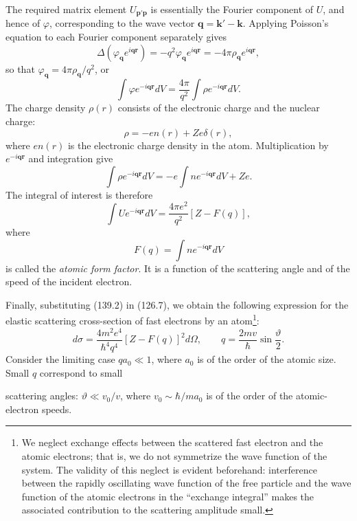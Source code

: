 The required matrix element $U_{\mathbf p'\mathbf p}$ is essentially the
Fourier component of $U$, and hence of $\varphi$, corresponding to the wave
vector $\mathbf q=\mathbf k'-\mathbf k$. Applying Poisson's equation to each
Fourier component separately gives
\[
 \Delta(\varphi_{\mathbf q}e^{i\mathbf{qr}})=-q^2\varphi_{\mathbf q}e^{i\mathbf{qr}}
 =-4\pi\rho_{\mathbf q}e^{i\mathbf{qr}},
\]
so that $\varphi_{\mathbf q}=4\pi\rho_{\mathbf q}/q^2$, or
\begin{equation}
 \int\varphi e^{-i\mathbf{qr}}dV=\frac{4\pi}{q^2}\int\rho e^{-i\mathbf{qr}}dV.
 \tag{139.1}
\end{equation}
The charge density $\rho(r)$ consists of the electronic charge and the nuclear
charge:
\[
 \rho=-en(r)+Ze\delta(r),
\]
where $en(r)$ is the electronic charge density in the atom. Multiplication by
$e^{-i\mathbf{qr}}$ and integration give
\[
 \int\rho e^{-i\mathbf{qr}}dV=-e\int ne^{-i\mathbf{qr}}dV+Ze.
\]
The integral of interest is therefore
\begin{equation}
 \int Ue^{-i\mathbf{qr}}dV=\frac{4\pi e^2}{q^2}[Z-F(q)],
 \tag{139.2}
\end{equation}
where
\begin{equation}
 F(q)=\int ne^{-i\mathbf{qr}}dV
 \tag{139.3}
\end{equation}
is called the \emph{atomic form factor}. It is a function of the scattering
angle and of the speed of the incident electron.

Finally, substituting (139.2) in (126.7), we obtain the following expression
for the elastic scattering cross-section of fast electrons by an
atom\footnote{We neglect exchange effects between the scattered fast electron
and the atomic electrons; that is, we do not symmetrize the wave function of
the system. The validity of this neglect is evident beforehand: interference
between the rapidly oscillating wave function of the free particle and the
wave function of the atomic electrons in the ``exchange integral'' makes the
associated contribution to the scattering amplitude small.}:
\begin{equation}
 d\sigma=\frac{4m^2e^4}{\hbar^4q^4}[Z-F(q)]^2d\Omega,\qquad
 q=\frac{2mv}{\hbar}\sin\frac\vartheta2.
 \tag{139.4}
\end{equation}
Consider the limiting case $qa_0\ll1$, where $a_0$ is of the order of the
atomic size. Small $q$ correspond to small

scattering angles: $\vartheta\ll v_0/v$, where
$v_0\sim\hbar/ma_0$ is of the order of the atomic-electron speeds.

